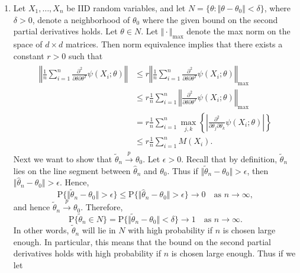 \documentclass[12pt]{article}
\newcommand{\Prob}{\mathrm{P}}
\begin{document}
\begin{enumerate}
\item
Let $X_1, \ldots, X_n$ be IID random variables, and let $N = \{\theta : \Vert \theta - \theta_0 \Vert < \delta\}$, where $\delta > 0$, denote a neighborhood of $\theta_0$ where the given bound on the second partial derivatives holds. Let $\theta \in N$. Let $\Vert \cdot \Vert_\mathrm{max}$ denote the max norm on the space of $d \times d$ matrices. Then norm equivalence implies that there exists a constant $r > 0$ such that
\begin{align} \label{eq:1}
\begin{split}
\left\Vert \frac{1}{n} \sum_{i=1}^n \frac{\partial^2}{\partial \theta \partial \theta^T} \psi(X_i; \theta) \right\Vert &\leq r\left\Vert \frac{1}{n} \sum_{i=1}^n \frac{\partial^2}{\partial \theta \partial \theta^T} \psi(X_i; \theta) \right\Vert_\mathrm{max} \\
&\leq r\frac{1}{n} \sum_{i=1}^n \left\Vert \frac{\partial^2}{\partial \theta \partial \theta^T} \psi(X_i; \theta) \right\Vert_\mathrm{max} \\
&= r\frac{1}{n} \sum_{i=1}^n \max_{j, k} \left\{\left| \frac{\partial^2}{\partial \theta_j \partial \theta_k} \psi(X_i; \theta) \right| \right\} \\
&\leq r\frac{1}{n} \sum_{i=1}^n M(X_i).
\end{split}
\end{align}
Next we want to show that $\tilde{\theta}_n \overset{p}\to \theta_0$. Let $\epsilon > 0$. Recall that by definition, $\tilde{\theta}_n$ lies on the line segment between $\hat{\theta}_n$ and $\theta_0$. Thus if $\Vert \tilde{\theta}_n - \theta_0 \Vert > \epsilon$, then $\Vert \hat{\theta}_n - \theta_0 \Vert > \epsilon$. Hence,
\begin{equation*}
\Prob \{\Vert \tilde{\theta}_n - \theta_0 \Vert > \epsilon \} \leq \Prob \{\Vert \hat{\theta}_n - \theta_0 \Vert > \epsilon\} \to 0 \quad \text{as $n \to \infty$},
\end{equation*}
and hence $\tilde{\theta}_n \overset{p}\to \theta_0$. Therefore,
\begin{equation*}
\Prob \{\tilde{\theta}_n \in N\} = \Prob \{\Vert \tilde{\theta}_n - \theta_0 \Vert < \delta\} \to 1 \quad \text{as $n \to \infty$}.
\end{equation*}
In other words, $\tilde{\theta}_n$ will lie in $N$ with high probability if $n$ is chosen large enough. In particular, this means that the bound on the second partial derivatives holds with high probability if $n$ is chosen large enough. Thus if we let
\begin{equation*}

\end{equation*}
\end{enumerate}
\end{document}
